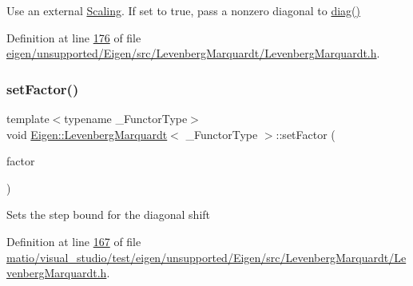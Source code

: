 Use an external \hyperlink{class_scaling}{Scaling}. If set to true, pass a nonzero diagonal to \hyperlink{class_eigen_1_1_levenberg_marquardt_a6e237ca1f23cdf5caa98fe23c6bcf464}{diag()} 

Definition at line \hyperlink{eigen_2unsupported_2_eigen_2src_2_levenberg_marquardt_2_levenberg_marquardt_8h_source_l00176}{176} of file \hyperlink{eigen_2unsupported_2_eigen_2src_2_levenberg_marquardt_2_levenberg_marquardt_8h_source}{eigen/unsupported/\+Eigen/src/\+Levenberg\+Marquardt/\+Levenberg\+Marquardt.\+h}.

\mbox{\label{class_eigen_1_1_levenberg_marquardt_a3054eeba042b197ae8d415729770db69}} 
\subsubsection{\texorpdfstring{set\+Factor()}{setFactor()}\hspace{0.1cm}{\footnotesize\ttfamily [1/2]}}
{\footnotesize\ttfamily template$<$typename \+\_\+\+Functor\+Type$>$ \\
void \hyperlink{class_eigen_1_1_levenberg_marquardt}{Eigen\+::\+Levenberg\+Marquardt}$<$ \+\_\+\+Functor\+Type $>$\+::set\+Factor (\begin{DoxyParamCaption}\item[{Real\+Scalar}]{factor }\end{DoxyParamCaption})\hspace{0.3cm}{\ttfamily [inline]}}

Sets the step bound for the diagonal shift 

Definition at line \hyperlink{matio_2visual__studio_2test_2eigen_2unsupported_2_eigen_2src_2_levenberg_marquardt_2_levenberg_marquardt_8h_source_l00167}{167} of file \hyperlink{matio_2visual__studio_2test_2eigen_2unsupported_2_eigen_2src_2_levenberg_marquardt_2_levenberg_marquardt_8h_source}{matio/visual\+\_\+studio/test/eigen/unsupported/\+Eigen/src/\+Levenberg\+Marquardt/\+Levenberg\+Marquardt.\+h}.

\mbox{\label{class_eigen_1_1_levenberg_marquardt_a3054eeba042b197ae8d415729770db69}} 
